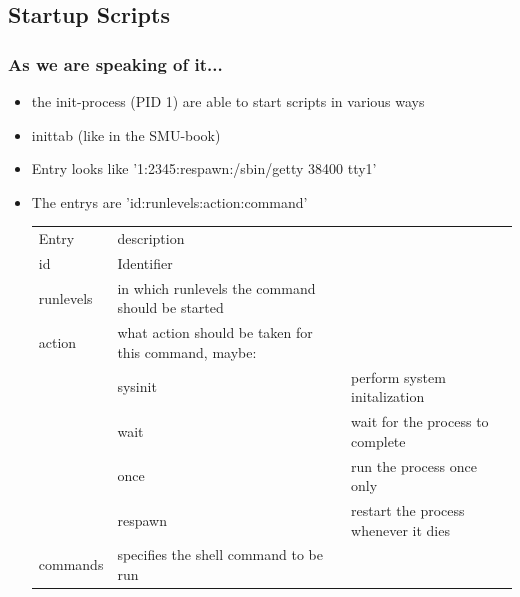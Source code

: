 \documentclass[hyperref={pdfpagelabels=false}]{beamer}
\begin{document}
    \subsection{Startup Scripts}
	    \begin{frame}
			\frametitle{As we are speaking of it...}
			\begin{itemize}
                \item<1-> the init-process (PID 1) are able to start scripts in various ways
                \item<1-> inittab (like in the SMU-book)
                \item<1-> Entry looks like '1:2345:respawn:/sbin/getty 38400 tty1'
                \item<2-> The entrys are 'id:runlevels:action:command'
                \begin{tabular}{lll}
                Entry & description \\
                id & Identifier \\
                runlevels & in which runlevels the command should be started \\
                action & what action should be taken for this command, maybe: \\
                & sysinit & perform system initalization \\
                & wait & wait for the process to complete \\
                & once & run the process once only \\
                & respawn & restart the process whenever it dies \\
                commands & specifies the shell command to be run
                \end{tabular}
            \end{itemize}
		\end{frame}
\end{document}
